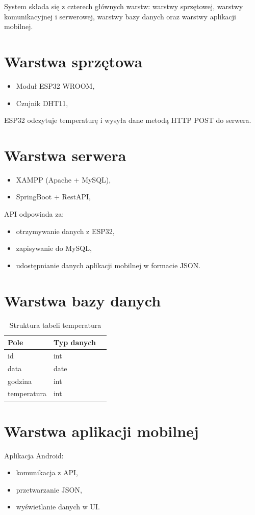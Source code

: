 System składa się z czterech głównych warstw: warstwy sprzętowej, warstwy komunikacyjnej i serwerowej, warstwy bazy danych oraz warstwy aplikacji mobilnej.

\section{Warstwa sprzętowa}
\begin{itemize}
    \item Moduł ESP32 WROOM,
    \item Czujnik DHT11,
\end{itemize}

ESP32 odczytuje temperaturę i wysyła dane metodą HTTP POST do serwera.

\section{Warstwa serwera}
\begin{itemize}
    \item XAMPP (Apache + MySQL),
    \item SpringBoot + RestAPI, \\
\end{itemize}

API odpowiada za:
\begin{itemize}
    \item otrzymywanie danych z ESP32,
    \item zapisywanie do MySQL,
    \item udostępnianie danych aplikacji mobilnej w formacie JSON.
\end{itemize}

\section{Warstwa bazy danych}
\begin{table}[ht!]
\centering
\caption{Struktura tabeli temperatura}
\label{tab:temperatura}
\begin{tabular}{lll}
\toprule
Pole        & Typ danych \\  
\midrule
id          & int \\
data        & date \\ 
godzina     & int \\
temperatura & int \\
\bottomrule 
\end{tabular}
\end{table}

\section{Warstwa aplikacji mobilnej}
Aplikacja Android:
\begin{itemize}
    \item komunikacja z API,
    \item przetwarzanie JSON,
    \item wyświetlanie danych w UI.
\end{itemize}